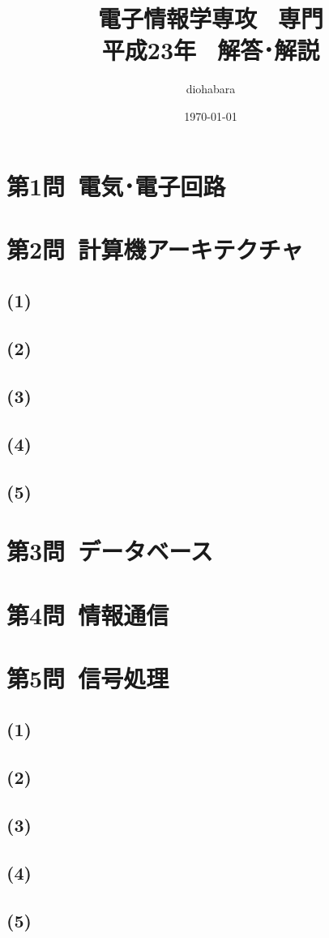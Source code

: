 \documentclass[a4paper,12pt,xelatex,ja=standard]{bxjsarticle}
\title{電子情報学専攻 \, 専門 \\ 平成23年 \, 解答･解説}
\author{diohabara}
\date{\today}
\begin{document}
\maketitle

\section*{第1問\ 電気･電子回路}

\section*{第2問\ 計算機アーキテクチャ}
\subsection*{(1)}

\subsection*{(2)}

\subsection*{(3)}

\subsection*{(4)}

\subsection*{(5)}

\section*{第3問\ データベース}

\section*{第4問\ 情報通信}

\section*{第5問\ 信号処理}
\subsection*{(1)}

\subsection*{(2)}

\subsection*{(3)}

\subsection*{(4)}

\subsection*{(5)}
\end{document}
